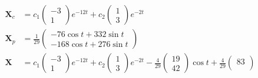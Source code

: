 \documentclass{article}
\begin{document}
\begin{align*}
  \mathbf{X}_c    & = c_1 \begin{pmatrix}
                            -3 \\
                            1
                          \end{pmatrix} e^{-12 t} + c_2 \begin{pmatrix}
                                                          1 \\
                                                          3
                                                        \end{pmatrix} e^{-2 t}                                                                                 \\
  \mathbf{X}_p    & = \frac{1}{29} \begin{pmatrix}
                                     -76 \cos t + 332 \sin t \\
                                     -168 \cos t + 276 \sin t
                                   \end{pmatrix}                                                                                                     \\
  \mathbf{X}      & = c_1 \begin{pmatrix}
                            -3 \\
                            1
                          \end{pmatrix} e^{-12 t} + c_2 \begin{pmatrix}
                                                          1 \\
                                                          3
                                                        \end{pmatrix} e^{-2 t} - \frac{4}{29} \begin{pmatrix}
                                                                                                19 \\
                                                                                                42
                                                                                              \end{pmatrix} \cos t + \frac{4}{29} \begin{pmatrix}
                                                                                                                                    83 \\

\end{pmatrix}
\end{align*}
\end{document}
